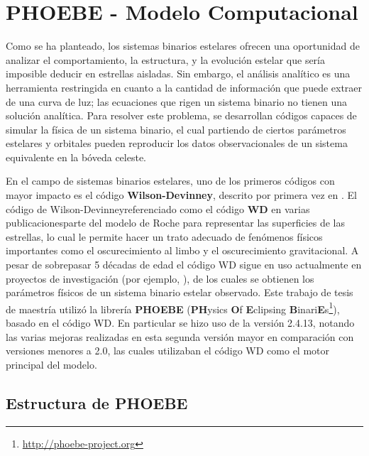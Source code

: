 \chapter{PHOEBE - Modelo Computacional}

Como se ha planteado, los sistemas binarios estelares ofrecen una oportunidad de
analizar el comportamiento, la estructura, y la evolución estelar que sería imposible 
deducir en estrellas aisladas. Sin embargo, el análisis analítico es una herramienta
restringida en cuanto a la cantidad de información que puede extraer de una
curva de luz; las ecuaciones que rigen un sistema binario no tienen una solución
analítica. Para resolver este problema, se desarrollan códigos capaces de simular la
física de un sistema binario, el cual partiendo de ciertos parámetros estelares
y orbitales pueden reproducir los datos observacionales de un sistema
equivalente en la bóveda celeste.

En el campo de sistemas binarios estelares, uno de los primeros códigos con
mayor impacto es el código \textbf{Wilson-Devinney}, descrito por primera vez en
. El
código de Wilson-Devinney\textemdash referenciado como el código \textbf{WD} en
varias publicaciones\textemdash parte del modelo de Roche para representar las
superficies de las estrellas, lo cual le permite hacer un trato adecuado de
fenómenos físicos importantes como el oscurecimiento al limbo y el
oscurecimiento gravitacional. A pesar de sobrepasar 5 décadas de edad el código
WD sigue en uso actualmente en proyectos de investigación (por ejemplo,
), de los cuales se
obtienen los parámetros físicos de un sistema binario estelar observado. Este
trabajo de tesis de maestría utilizó la librería \textbf{PHOEBE}
(\textbf{PH}ysics \textbf{O}f \textbf{E}clipsing
\textbf{B}inari\textbf{E}s\footnote{\url{http://phoebe-project.org}}), basado en
el código WD. En particular se hizo uso de la versión 2.4.13, notando las varias
mejoras realizadas en esta segunda versión mayor en comparación con versiones
menores a 2.0, las cuales utilizaban el código WD como el motor principal del
modelo.

\section{Estructura de PHOEBE}

